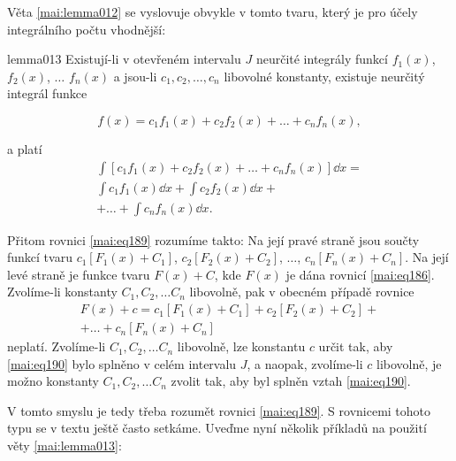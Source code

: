       Věta \eqref{mai:lemma012} se vyslovuje obvykle v tomto tvaru, který je pro účely integrálního
      počtu vhodnější:
      \begin{mathlemma}{}{lemma013}       
        Existují-li v otevřeném intervalu \(J\) neurčité integrály funkcí \(f_1(x)\), \(f_2(x)\),
        \(\ldots\) \(f_n(x)\) a jsou-li \(c_1, c_2, \ldots, c_n\) libovolné konstanty, existuje
        neurčitý integrál funkce  
        \begin{fleqn}[0pt]
          \begin{equation}\label{mai:eq188}
            f(x) = c_1f_1(x) + c_2f_2(x) + \ldots + c_nf_n(x),
          \end{equation}
        \end{fleqn}
        a platí
        \begin{multline}\label{mai:eq189}
          \int[c_1f_1(x) + c_2f_2(x) + \ldots + c_nf_n(x)]\dd{x}  =    \\   
          \int{c_1f_1(x)}\dd{x} + \int{c_2f_2(x)}\dd{x} +              \\
          + \ldots + \int{c_nf_n(x)}\dd{x}.
        \end{multline}
      \end{mathlemma}
      Přitom rovnici \eqref{mai:eq189} rozumíme takto: Na její pravé straně jsou součty funkcí tvaru
      \(c_1[F_1(x) + C_1]\), \(c_2[F_2(x) + C_2]\), \(\ldots\), \(c_n[F_n(x) + C_n]\). Na její levé
      straně je funkce tvaru \(F(x)+C\), kde \(F(x)\) je dána rovnicí \eqref{mai:eq186}. Zvolíme-li
      konstanty \(C_1, C_2, \ldots C_n\) libovolně, pak v obecném případě rovnice 
      \begin{multline}\label{mai:eq190}
        F(x) + c = c_1[F_1(x) + C_1] + c_2[F_2(x) + C_2] +\\ 
             + \ldots + c_n[F_n(x) + C_n]
      \end{multline}
      neplatí. Zvolíme-li \(C_1, C_2, \ldots C_n\) libovolně, lze konstantu \(c\) určit tak, aby
      \eqref{mai:eq190} bylo splněno v celém intervalu \(J\), a naopak, zvolíme-li \(c\) libovolně,
      je možno konstanty \(C_1, C_2, \ldots C_n\) zvolit tak, aby byl splněn vztah
      \eqref{mai:eq190}. 

      V tomto smyslu je tedy třeba rozumět rovnici \eqref{mai:eq189}. S rovnicemi tohoto typu se v
      textu ještě často setkáme. Uveďme nyní několik příkladů na použití věty \eqref{mai:lemma013}:

